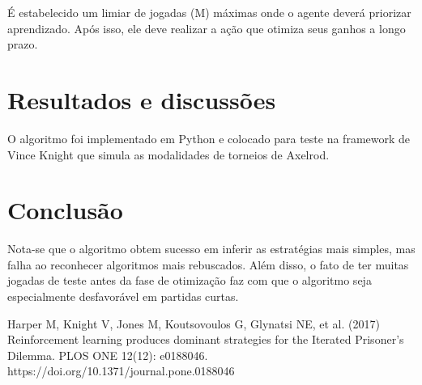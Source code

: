 \documentclass[a4paper]{article}
\begin{document}
			É estabelecido um limiar de jogadas (M) máximas onde o agente deverá priorizar aprendizado. Após isso, ele deve realizar a ação que otimiza seus ganhos a longo prazo.
		
	\section{Resultados e discussões}
		O algoritmo foi implementado em Python e colocado para teste na framework de Vince Knight que simula as modalidades de torneios de Axelrod.

	\section{Conclusão}
		Nota-se que o algoritmo obtem sucesso em inferir as estratégias mais simples, mas falha ao reconhecer algoritmos mais rebuscados.
		Além disso, o fato de ter muitas jogadas de teste antes da fase de otimização faz com que o algoritmo seja especialmente desfavorável em partidas curtas.

	\begin{thebibliography}{9}
			Harper M, Knight V, Jones M, Koutsovoulos G, Glynatsi NE, et al. (2017) Reinforcement learning produces dominant strategies for the Iterated Prisoner’s Dilemma. PLOS ONE 12(12): e0188046. https://doi.org/10.1371/journal.pone.0188046
	\end{thebibliography}
\end{document}
